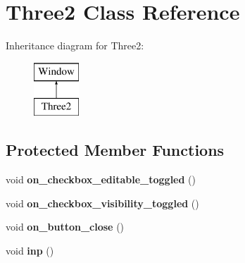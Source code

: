 \hypertarget{class_three2}{}\section{Three2 Class Reference}
\label{class_three2}
Inheritance diagram for Three2\+:\begin{figure}[H]
\begin{center}
\leavevmode
\includegraphics[height=2.000000cm]{class_three2}
\end{center}
\end{figure}
\subsection*{Protected Member Functions}
\begin{DoxyCompactItemize}
\item 
\mbox{\label{class_three2_a3a033e3839da176903f784848c7ed3a3}} 
void {\bfseries on\+\_\+checkbox\+\_\+editable\+\_\+toggled} ()
\item 
\mbox{\label{class_three2_a3bf07f6691f05022993a69ed2c9178dc}} 
void {\bfseries on\+\_\+checkbox\+\_\+visibility\+\_\+toggled} ()
\item 
\mbox{\label{class_three2_a388072d4fa014647e269d63d18ea6d6c}} 
void {\bfseries on\+\_\+button\+\_\+close} ()
\item 
\mbox{\label{class_three2_a9140de67b33e78597e81c1714598f9d6}} 
void {\bfseries inp} ()
\end{DoxyCompactItemize}
